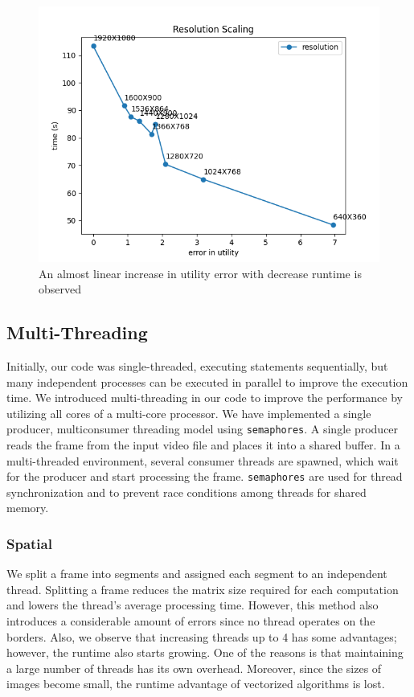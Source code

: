 \documentclass[conference]{IEEEtran}
\begin{document}
\begin{figure}[htbp]
    \centerline{\includegraphics[scale=0.55]{plots/plot_resolution.png}}
    \caption{An almost linear increase in utility error with decrease runtime is observed}
    \label{res_evt}
\end{figure}


\subsection{Multi-Threading}
Initially, our code was single-threaded, executing statements sequentially, but many independent processes can be executed in parallel to improve the execution time.
We introduced multi-threading in our code to improve the performance by utilizing all cores of a multi-core processor. We have implemented a single producer, multiconsumer threading model using \verb|semaphores|.
A single producer reads the frame from the input video file and places it into a shared buffer. In a multi-threaded environment, several consumer threads are spawned, which wait for the
producer and start processing the frame. \verb|semaphores| are used for thread synchronization and to prevent race conditions among threads for shared memory.

\subsubsection{Spatial}
We split a frame into segments and assigned each segment to an independent thread. Splitting a frame reduces the matrix size required for each computation and lowers the
thread's average processing time. However, this method also introduces a considerable amount of errors since no thread operates on the borders.
Also, we observe that increasing threads up to 4 has some advantages; however, the runtime also starts growing. One of the reasons is that maintaining a large number of threads
has its own overhead. Moreover, since the sizes of images become small, the runtime advantage of vectorized algorithms is lost.
\end{document}
